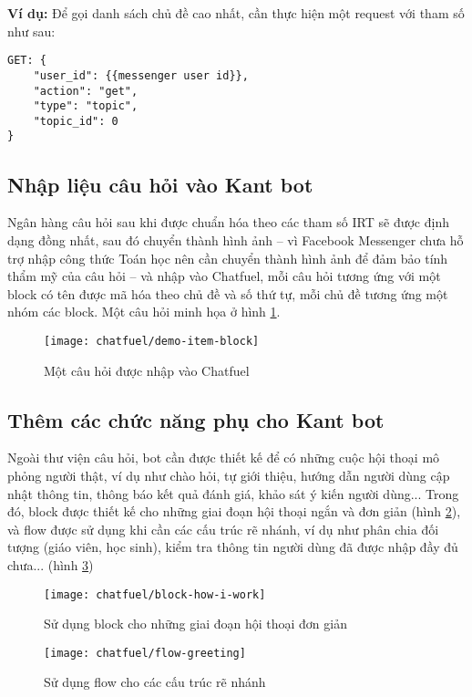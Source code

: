 \noindent\textbf{Ví dụ:} Để gọi danh sách chủ đề cao nhất, cần thực hiện một request với tham số như sau:
\begin{lstlisting}
GET: {
	"user_id": {{messenger user id}},
	"action": "get",
	"type": "topic",
	"topic_id": 0
}
\end{lstlisting}\par

\subsection{Nhập liệu câu hỏi vào Kant bot}
Ngân hàng câu hỏi sau khi được chuẩn hóa theo các tham số IRT sẽ được định dạng đồng nhất, sau đó chuyển thành hình ảnh – vì Facebook Messenger chưa hỗ trợ nhập công thức Toán học nên cần chuyển thành hình ảnh để đảm bảo tính thẩm mỹ của câu hỏi – và nhập vào Chatfuel, mỗi câu hỏi tương ứng với một block có tên được mã hóa theo chủ đề và số thứ tự, mỗi chủ đề tương ứng một nhóm các block. Một câu hỏi minh họa ở hình \ref{fig:fig-c3-demo-item-block}.
\begin{figure}[htb!]\centering
	\texttt{[image: chatfuel/demo-item-block]}
	\caption{Một câu hỏi được nhập vào Chatfuel}
	\label{fig:fig-c3-demo-item-block}
\end{figure}\par

\subsection{Thêm các chức năng phụ cho Kant bot}
Ngoài thư viện câu hỏi, bot cần được thiết kế để có những cuộc hội thoại mô phỏng người thật, ví dụ như chào hỏi, tự giới thiệu, hướng dẫn người dùng cập nhật thông tin, thông báo kết quả đánh giá, khảo sát ý kiến người dùng... Trong đó, block được thiết kế cho những giai đoạn hội thoại ngắn và đơn giản (hình \ref{fig:fig-c3-block-how-i-work}), và flow được sử dụng khi cần các cấu trúc rẽ nhánh, ví dụ như phân chia đối tượng (giáo viên, học sinh), kiểm tra thông tin người dùng đã được nhập đầy đủ chưa... (hình \ref{fig:fig-c3-flow-greeting})\par
\begin{figure}[htb!]\centering
	\texttt{[image: chatfuel/block-how-i-work]}
	\caption{Sử dụng block cho những giai đoạn hội thoại đơn giản}
	\label{fig:fig-c3-block-how-i-work}
\end{figure}\par

\begin{figure}[htb!]\centering
	\texttt{[image: chatfuel/flow-greeting]}
	\caption{Sử dụng flow cho các cấu trúc rẽ nhánh}
	\label{fig:fig-c3-flow-greeting}
\end{figure}\par
